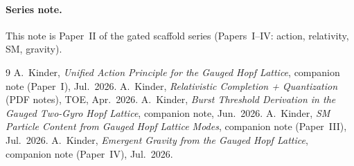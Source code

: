 \documentclass[11pt]{article}
\begin{document}
\paragraph{Series note.}
This note is Paper~II of the gated scaffold series (Papers~I--IV: action, relativity, SM, gravity).

\begin{thebibliography}{9}
A.~Kinder, \emph{Unified Action Principle for the Gauged Hopf Lattice},
companion note (Paper~I), Jul.~2026.
A.~Kinder, \emph{Relativistic Completion + Quantization} (PDF notes), TOE, Apr.~2026.
A.~Kinder, \emph{Burst Threshold Derivation in the Gauged Two-Gyro Hopf Lattice},
companion note, Jun.~2026.
A.~Kinder, \emph{SM Particle Content from Gauged Hopf Lattice Modes},
companion note (Paper~III), Jul.~2026.
A.~Kinder, \emph{Emergent Gravity from the Gauged Hopf Lattice},
companion note (Paper~IV), Jul.~2026.
\end{thebibliography}
\end{document}

